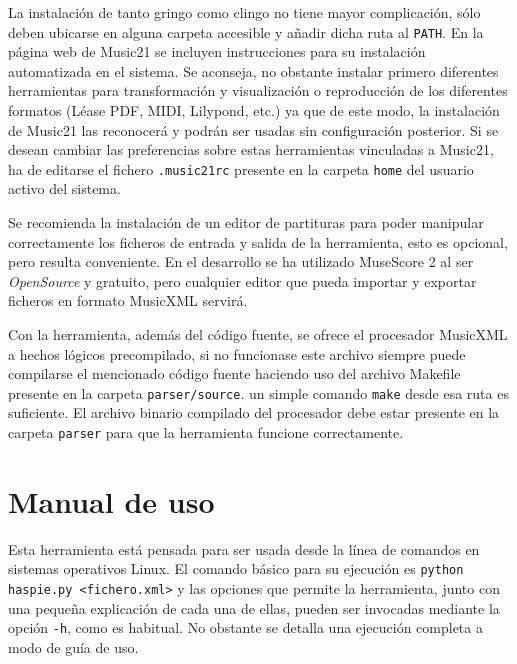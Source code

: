 La instalación de tanto gringo como clingo no tiene mayor complicación, sólo deben ubicarse en alguna carpeta accesible y añadir dicha ruta al \texttt{PATH}. En la página web de Music21\cite{music21web} se incluyen instrucciones para su instalación automatizada en el sistema. Se aconseja, no obstante instalar primero diferentes herramientas para transformación y visualización o reproducción de los diferentes formatos (Léase PDF, MIDI, Lilypond, etc.) ya que de este modo, la instalación de Music21 las reconocerá y podrán ser usadas sin configuración posterior. Si se desean cambiar las preferencias sobre estas herramientas vinculadas a Music21, ha de editarse el fichero \texttt{.music21rc} presente en la carpeta \texttt{home} del usuario activo del sistema.
	
Se recomienda la instalación de un editor de partituras para poder manipular correctamente los ficheros de entrada y salida de la herramienta, esto es opcional, pero resulta conveniente. En el desarrollo se ha utilizado MuseScore 2 al ser \textit{OpenSource} y gratuito, pero cualquier editor que pueda importar y exportar ficheros en formato MusicXML servirá.

Con la herramienta, además del código fuente, se ofrece el procesador MusicXML a hechos lógicos precompilado, si no funcionase este archivo siempre puede compilarse el mencionado código fuente haciendo uso del archivo Makefile presente en la carpeta \texttt{parser/source}. un simple comando \texttt{make} desde esa ruta es suficiente. El archivo binario compilado del procesador debe estar presente en la carpeta \texttt{parser} para que la herramienta funcione correctamente.

\chapter{Manual de uso}
\label{chap:usage}
Esta herramienta está pensada para ser usada desde la línea de comandos en sistemas operativos Linux. El comando básico para su ejecución es \texttt{python haspie.py <fichero.xml>} y las opciones que permite la herramienta, junto con una pequeña explicación de cada una de ellas, pueden ser invocadas mediante la opción \texttt{-h}, como es habitual. No obstante se detalla una ejecución completa a modo de guía de uso.

